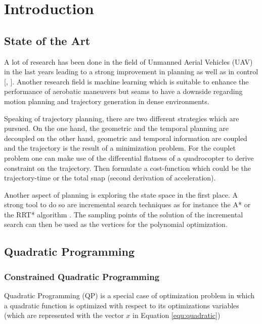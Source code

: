 
\chapter{Introduction}\label{sec:introduction}

\section{State of the Art}\label{sec:state}

A lot of research has been done in the field of Unmanned Aerial Vehicles (UAV) in the last years leading to a strong improvement in planning \cite{he} as well as in control [\cite{colling}, \cite{hehn}].  Another research field is machine learning \cite{lup} which is suitable to enhance the performance of aerobatic maneuvers but seams to have a downside regarding motion planning and trajectory generation in dense environments. \newline

Speaking of trajectory planning, there are two different strategies which are pursued. On the one hand, the geometric and the temporal planning are decoupled  \cite{bou} on the other hand, geometric and temporal information are coupled and the trajectory is the result of a minimization problem. For the couplet problem one can make use of the differential flatness of a quadrocopter to derive constraint on the trajectory. Then formulate a cost-function which could be the trajectory-time \cite{hehn} or the total snap \cite{mellinger} (second derivation of acceleration). \newline

Another aspect of planning is exploring the state space in the first place. A strong tool to do so are incremental search techniques as for instance the A* \cite{lik} or the RRT* algorithm \cite{richter}. The sampling points of the solution of the incremental search can then be used as the vertices for the polynomial optimization.

\section{Quadratic Programming}\label{sec:quadratic}

\subsection{Constrained Quadratic Programming}

Quadratic Programming (QP) is a special case of optimization problem in which a quadratic function is optimized with respect to its optimizations variables (which are represented with the vector $x$ in Equation \ref{equ:quadratic})

